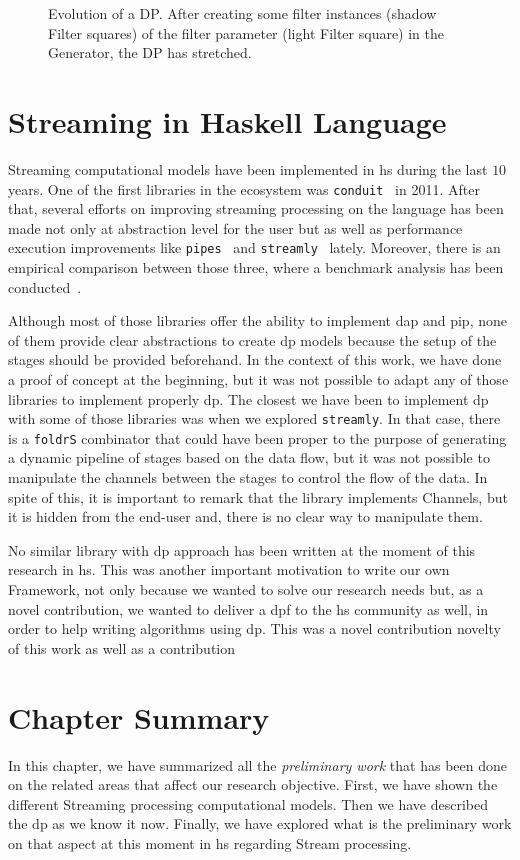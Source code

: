 \begin{figure}[h]
 \centering
 \caption{Evolution of a DP. After creating some filter instances (shadow Filter squares) of the filter parameter (light Filter square) in the Generator, the DP has stretched.}
\label{fig:activeDP}
\end{figure}


\section{Streaming in Haskell Language}
Streaming computational models have been implemented in \acrfull{hs} during the last $10$ years. One of the first libraries in the ecosystem was \texttt{conduit}~\cite{conduit} in 2011.
After that, several efforts on improving streaming processing on the language has been made not only at abstraction level for the user but as well as performance execution 
improvements like \texttt{pipes}~\cite{pipes} and \texttt{streamly}~\cite{streamly} lately.
Moreover, there is an empirical comparison between those three, where a benchmark analysis has been conducted~\cite{benchstreamhs}.

Although most of those libraries offer the ability to implement \acrshort{dap} and \acrshort{pip}, none of them provide clear abstractions to create \acrshort{dp} models because
the setup of the stages should be provided beforehand. In the context of this work, we have done a proof of concept at the beginning, 
but it was not possible to adapt any of those libraries to implement properly \acrshort{dp}. 
The closest we have been to implement \acrshort{dp} with some of those libraries was when we explored \texttt{streamly}.
In that case, there is a \texttt{foldrS} combinator that could have been proper to the purpose of generating a dynamic pipeline of stages based on the data flow, but it was not possible to manipulate the channels between the stages to control the flow of the data. 
In spite of this, it is important to remark that the library implements Channels, but it is hidden from the end-user and, there is no clear way to manipulate them.

No similar library with \acrshort{dp} approach has been written at the moment of this research in \acrlong{hs}. 
This was another important motivation to write our own Framework, not only because we wanted to solve our research needs but, as a novel contribution, we wanted to deliver a \acrshort{dpf} to the \acrshort{hs} community as well, in order to help writing algorithms using \acrshort{dp}. 
This was a novel contribution novelty of this work as well as a contribution

\section{Chapter Summary}
In this chapter, we have summarized all the \emph{preliminary work} that has been done on the related areas that affect our research objective.
First, we have shown the different Streaming processing computational models. Then we have described the \acrshort{dp} as we know it now. 
Finally, we have explored what is the preliminary work on that aspect at this moment in \acrshort{hs} regarding Stream processing. 
